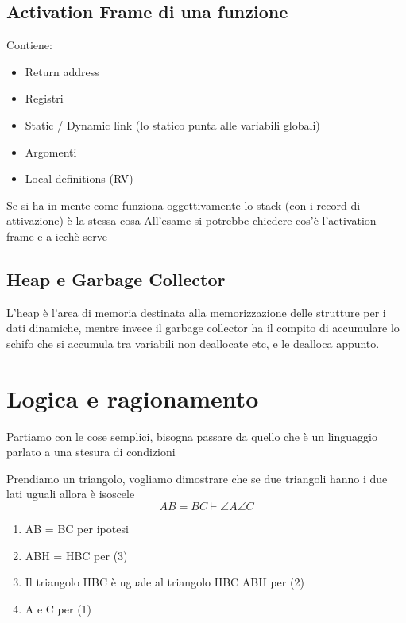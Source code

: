 \documentclass[12pt, a4paper, openany, oneside]{book}
\begin{document}
\section{Activation Frame di una funzione}
Contiene:
\begin{itemize}
	\item Return address
	\item Registri
	\item Static / Dynamic link (lo statico punta alle variabili globali)
	\item Argomenti
	\item Local definitions (RV)
\end{itemize}
Se si ha in mente come funziona oggettivamente lo stack (con i record di
attivazione) è la stessa cosa \newline
All'esame si potrebbe chiedere cos'è l'activation frame e a icchè serve
\section{Heap e Garbage Collector}
L'heap è l'area di memoria destinata alla memorizzazione delle strutture per i
dati dinamiche, mentre invece il garbage collector ha il compito di accumulare
lo schifo che si accumula tra variabili non deallocate etc, e le dealloca 
appunto.
\chapter{Logica e ragionamento}
Partiamo con le cose semplici, bisogna passare da quello che è un linguaggio 
parlato a una stesura di condizioni \newline

Prendiamo un triangolo, vogliamo dimostrare che se due triangoli hanno i due lati uguali allora è isoscele \newline
$$AB = BC \vdash \angle A \angle C$$ 
\begin{enumerate}
	\item AB = BC per ipotesi
	\item ABH = HBC per (3)
	\item Il triangolo HBC è uguale al triangolo HBC ABH per (2)
	\item A e C per (1)
\end{enumerate}
\end{document}
